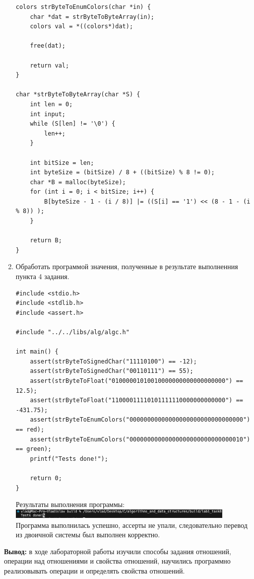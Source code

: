 \documentclass[a4paper,14pt]{extarticle}
\begin{document}
\begin{enumerate}
\begin{verbatim}
colors strByteToEnumColors(char *in) {
    char *dat = strByteToByteArray(in);
    colors val = *((colors*)dat);

    free(dat);

    return val;
}

char *strByteToByteArray(char *S) {
    int len = 0;
    int input;
    while (S[len] != '\0') {
        len++;
    }
    
    int bitSize = len;
    int byteSize = (bitSize) / 8 + ((bitSize) % 8 != 0);
    char *B = malloc(byteSize);
    for (int i = 0; i < bitSize; i++) {
        B[byteSize - 1 - (i / 8)] |= ((S[i] == '1') << (8 - 1 - (i % 8)) );
    }
    
    return B;
}
\end{verbatim}
\item Обработать программой значения, полученные в результате выполненния пункта 4 задания.
\begin{verbatim}
#include <stdio.h>
#include <stdlib.h>
#include <assert.h>

#include "../../libs/alg/algc.h"

int main() {
    assert(strByteToSignedChar("11110100") == -12);
    assert(strByteToSignedChar("00110111") == 55);
    assert(strByteToFloat("01000001010010000000000000000000") == 12.5);
    assert(strByteToFloat("11000011110101111110000000000000") == -431.75);
    assert(strByteToEnumColors("00000000000000000000000000000000") == red);
    assert(strByteToEnumColors("00000000000000000000000000000010") == green);
    printf("Tests done!");

    return 0;
}
\end{verbatim}
Результаты выполнения программы:\\
\includegraphics[width=110mm]{8}\\
Программа выполнилась успешно, ассерты не упали, следовательно перевод из двоичной системы был выполнен корректно.
\end{enumerate}
\textbf{Вывод: } в ходе лабораторной работы изучили способы задания отношений, операции над отношениями и свойства отношений, научились программно реализовывать операции и определять свойства отношений.
\end{document}
